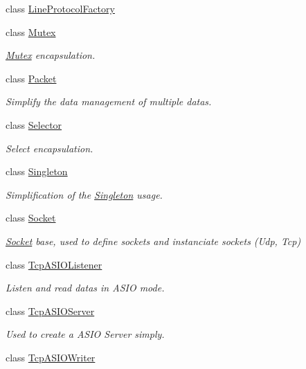 \begin{DoxyCompactItemize}
class \hyperlink{classmognetwork_1_1_line_protocol_factory}{Line\-Protocol\-Factory}
\item 
class \hyperlink{classmognetwork_1_1_mutex}{Mutex}
\begin{DoxyCompactList}\small\item\em \hyperlink{classmognetwork_1_1_mutex}{Mutex} encapsulation. \end{DoxyCompactList}\item 
class \hyperlink{classmognetwork_1_1_packet}{Packet}
\begin{DoxyCompactList}\small\item\em Simplify the data management of multiple datas. \end{DoxyCompactList}\item 
class \hyperlink{classmognetwork_1_1_selector}{Selector}
\begin{DoxyCompactList}\small\item\em Select encapsulation. \end{DoxyCompactList}\item 
class \hyperlink{classmognetwork_1_1_singleton}{Singleton}
\begin{DoxyCompactList}\small\item\em Simplification of the \hyperlink{classmognetwork_1_1_singleton}{Singleton} usage. \end{DoxyCompactList}\item 
class \hyperlink{classmognetwork_1_1_socket}{Socket}
\begin{DoxyCompactList}\small\item\em \hyperlink{classmognetwork_1_1_socket}{Socket} base, used to define sockets and instanciate sockets (Udp, Tcp) \end{DoxyCompactList}\item 
class \hyperlink{classmognetwork_1_1_tcp_a_s_i_o_listener}{Tcp\-A\-S\-I\-O\-Listener}
\begin{DoxyCompactList}\small\item\em Listen and read datas in A\-S\-I\-O mode. \end{DoxyCompactList}\item 
class \hyperlink{classmognetwork_1_1_tcp_a_s_i_o_server}{Tcp\-A\-S\-I\-O\-Server}
\begin{DoxyCompactList}\small\item\em Used to create a A\-S\-I\-O Server simply. \end{DoxyCompactList}\item 
class \hyperlink{classmognetwork_1_1_tcp_a_s_i_o_writer}{Tcp\-A\-S\-I\-O\-Writer}

\end{DoxyCompactItemize}
